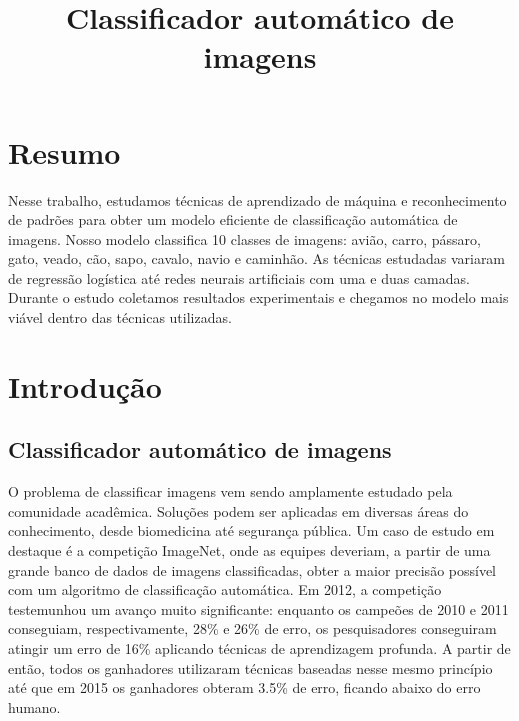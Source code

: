 \documentclass[conference]{IEEEtran}
\begin{document}
\title{Classificador automático de imagens}

\author{
\and
{}
}

\maketitle



\section{Resumo}

Nesse trabalho, estudamos técnicas de aprendizado de máquina e reconhecimento de padrões para obter um modelo eficiente de classificação automática de imagens. Nosso modelo classifica 10 classes de imagens: avião, carro, pássaro, gato, veado, cão, sapo, cavalo, navio e caminhão. As técnicas estudadas variaram de regressão logística até redes neurais artificiais com uma e duas camadas. Durante o estudo coletamos resultados experimentais e chegamos no modelo mais viável dentro das técnicas utilizadas.

\section{Introdução}

\subsection{Classificador automático de imagens}

O problema de classificar imagens vem sendo amplamente estudado pela comunidade acadêmica\cite{b1, b2, b3}. Soluções podem ser aplicadas em diversas áreas do conhecimento, desde biomedicina até segurança pública. Um caso de estudo em destaque é a competição ImageNet\cite{b4}, onde as equipes deveriam, a partir de uma grande banco de dados de imagens classificadas, obter a maior precisão possível com um algoritmo de classificação automática. Em 2012, a competição testemunhou um avanço muito significante: enquanto os campeões de 2010 e 2011 conseguiam, respectivamente, 28\% e 26\% de erro, os pesquisadores conseguiram atingir um erro de 16\% aplicando técnicas de aprendizagem profunda\cite{b5}. A partir de então, todos os ganhadores utilizaram técnicas baseadas nesse mesmo princípio até que em 2015 os ganhadores obteram 3.5\% de erro, ficando abaixo do erro humano.
\end{document}
